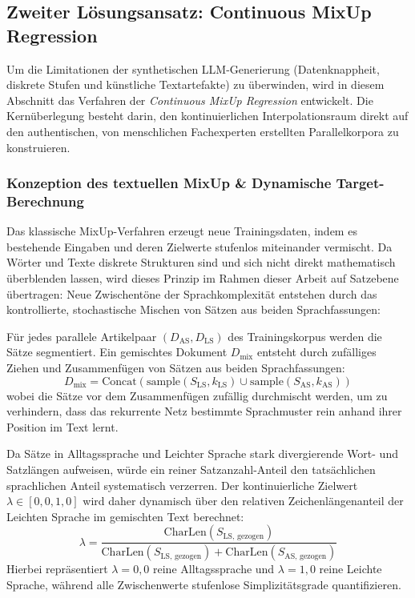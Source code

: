 \subsection{Zweiter Lösungsansatz: Continuous MixUp Regression}
\label{sec:mixup_regression}

Um die Limitationen der synthetischen LLM-Generierung (Datenknappheit, diskrete Stufen und künstliche Textartefakte) zu überwinden, wird in diesem Abschnitt das Verfahren der \textit{Continuous MixUp Regression} entwickelt. Die Kernüberlegung besteht darin, den kontinuierlichen Interpolationsraum direkt auf den authentischen, von menschlichen Fachexperten erstellten Parallelkorpora zu konstruieren.

\subsubsection{Konzeption des textuellen MixUp \& Dynamische Target-Berechnung}
\label{sec:mixup_konzeption}

Das klassische MixUp-Verfahren \citep{zhang2018mixup} erzeugt neue Trainingsdaten, indem es bestehende Eingaben und deren Zielwerte stufenlos miteinander vermischt. Da Wörter und Texte diskrete Strukturen sind und sich nicht direkt mathematisch überblenden lassen, wird dieses Prinzip im Rahmen dieser Arbeit auf Satzebene übertragen: Neue Zwischentöne der Sprachkomplexität entstehen durch das kontrollierte, stochastische Mischen von Sätzen aus beiden Sprachfassungen:

Für jedes parallele Artikelpaar $(D_{\text{AS}}, D_{\text{LS}})$ des Trainingskorpus werden die Sätze segmentiert. Ein gemischtes Dokument $D_{\text{mix}}$ entsteht durch zufälliges Ziehen und Zusammenfügen von Sätzen aus beiden Sprachfassungen:
\begin{equation}
    D_{\text{mix}} = \text{Concat}\left( \text{sample}(S_{\text{LS}}, k_{\text{LS}}) \cup \text{sample}(S_{\text{AS}}, k_{\text{AS}}) \right)
\end{equation}
wobei die Sätze vor dem Zusammenfügen zufällig durchmischt werden, um zu verhindern, dass das rekurrente Netz bestimmte Sprachmuster rein anhand ihrer Position im Text lernt.

Da Sätze in Alltagssprache und Leichter Sprache stark divergierende Wort- und Satzlängen aufweisen, würde ein reiner Satzanzahl-Anteil den tatsächlichen sprachlichen Anteil systematisch verzerren. Der kontinuierliche Zielwert $\lambda \in [0{,}0, 1{,}0]$ wird daher dynamisch über den relativen Zeichenlängenanteil der Leichten Sprache im gemischten Text berechnet:
\begin{equation}
    \lambda = \frac{\text{CharLen}(S_{\text{LS, gezogen}})}{\text{CharLen}(S_{\text{LS, gezogen}}) + \text{CharLen}(S_{\text{AS, gezogen}})}
\end{equation}
Hierbei repräsentiert $\lambda = 0{,}0$ reine Alltagssprache und $\lambda = 1{,}0$ reine Leichte Sprache, während alle Zwischenwerte stufenlose Simplizitätsgrade quantifizieren.

